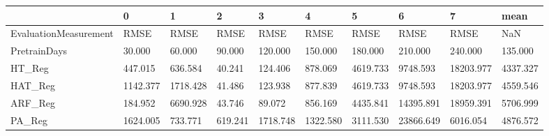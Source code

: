 \begin{tabular}{llllllllll}
\toprule
{} &        0 &        1 &       2 &        3 &        4 &        5 &         6 &         7 &     mean \\
\midrule
EvaluationMeasurement &     RMSE &     RMSE &    RMSE &     RMSE &     RMSE &     RMSE &      RMSE &      RMSE &      NaN \\
PretrainDays          &   30.000 &   60.000 &  90.000 &  120.000 &  150.000 &  180.000 &   210.000 &   240.000 &  135.000 \\
HT\_Reg                &  447.015 &  636.584 &  40.241 &  124.406 &  878.069 & 4619.733 &  9748.593 & 18203.977 & 4337.327 \\
HAT\_Reg               & 1142.377 & 1718.428 &  41.486 &  123.938 &  877.839 & 4619.733 &  9748.593 & 18203.977 & 4559.546 \\
ARF\_Reg               &  184.952 & 6690.928 &  43.746 &   89.072 &  856.169 & 4435.841 & 14395.891 & 18959.391 & 5706.999 \\
PA\_Reg                & 1624.005 &  733.771 & 619.241 & 1718.748 & 1322.580 & 3111.530 & 23866.649 &  6016.054 & 4876.572 \\
\bottomrule
\end{tabular}
